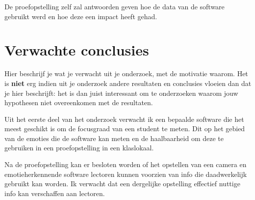 De proefopstelling zelf zal antwoorden geven hoe de data van de software gebruikt werd en hoe deze een impact heeft gehad. 


\section{Verwachte conclusies}
\label{sec:verwachte_conclusies}

Hier beschrijf je wat je verwacht uit je onderzoek, met de motivatie waarom. Het is \textbf{niet} erg indien uit je onderzoek andere resultaten en conclusies vloeien dan dat je hier beschrijft: het is dan juist interessant om te onderzoeken waarom jouw hypothesen niet overeenkomen met de resultaten.

Uit het eerste deel van het onderzoek verwacht ik een bepaalde software die het meest geschikt is om de focusgraad van een student te meten. Dit op het gebied van de emoties die de software kan meten en de haalbaarheid om deze te gebruiken in een proefopstelling in een klaslokaal.

Na de proefopstelling kan er besloten worden of het opstellen van een camera en emotieherkennende software lectoren kunnen voorzien van info die daadwerkelijk gebruikt kan worden. Ik verwacht dat een dergelijke opstelling effectief nuttige info kan verschaffen aan lectoren.